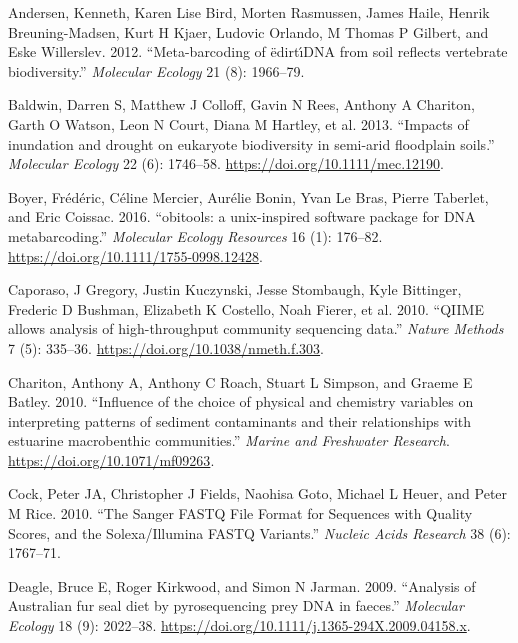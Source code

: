 \documentclass[
  letterpaper,
  DIV=11,
  numbers=noendperiod]{scrreprt}
\newlength{\cslhangindent}
\newlength{\cslentryspacingunit} %
\newenvironment{CSLReferences}[2] %
 {%
  \setlength{\parindent}{0pt}
  \ifodd #1
  \let\oldpar\par
  \def\par{\hangindent=\cslhangindent\oldpar}
  \fi
  \setlength{\parskip}{#2\cslentryspacingunit}
 }%
 {}
\begin{document}
\hypertarget{refs}{}
\begin{CSLReferences}{1}{0}
\leavevmode{}%
Andersen, Kenneth, Karen Lise Bird, Morten Rasmussen, James Haile,
Henrik Breuning-Madsen, Kurt H Kjaer, Ludovic Orlando, M Thomas P
Gilbert, and Eske Willerslev. 2012. {``{Meta-barcoding of {ë}dirt{ı́}DNA
from soil reflects vertebrate biodiversity}.''} \emph{Molecular Ecology}
21 (8): 1966--79.

\leavevmode{}%
Baldwin, Darren S, Matthew J Colloff, Gavin N Rees, Anthony A Chariton,
Garth O Watson, Leon N Court, Diana M Hartley, et al. 2013. {``{Impacts
of inundation and drought on eukaryote biodiversity in semi-arid
floodplain soils}.''} \emph{Molecular Ecology} 22 (6): 1746--58.
\url{https://doi.org/10.1111/mec.12190}.

\leavevmode{}%
Boyer, Frédéric, Céline Mercier, Aurélie Bonin, Yvan Le Bras, Pierre
Taberlet, and Eric Coissac. 2016. {``{obitools: a unix-inspired software
package for DNA metabarcoding}.''} \emph{Molecular Ecology Resources} 16
(1): 176--82. \url{https://doi.org/10.1111/1755-0998.12428}.

\leavevmode{}%
Caporaso, J Gregory, Justin Kuczynski, Jesse Stombaugh, Kyle Bittinger,
Frederic D Bushman, Elizabeth K Costello, Noah Fierer, et al. 2010.
{``{QIIME allows analysis of high-throughput community sequencing
data}.''} \emph{Nature Methods} 7 (5): 335--36.
\url{https://doi.org/10.1038/nmeth.f.303}.

\leavevmode{}%
Chariton, Anthony A, Anthony C Roach, Stuart L Simpson, and Graeme E
Batley. 2010. {``{Influence of the choice of physical and chemistry
variables on interpreting patterns of sediment contaminants and their
relationships with estuarine macrobenthic communities}.''} \emph{Marine
and Freshwater Research}. \url{https://doi.org/10.1071/mf09263}.

\leavevmode{}%
Cock, Peter JA, Christopher J Fields, Naohisa Goto, Michael L Heuer, and
Peter M Rice. 2010. {``The Sanger FASTQ File Format for Sequences with
Quality Scores, and the Solexa/Illumina FASTQ Variants.''} \emph{Nucleic
Acids Research} 38 (6): 1767--71.

\leavevmode{}%
Deagle, Bruce E, Roger Kirkwood, and Simon N Jarman. 2009. {``{Analysis
of Australian fur seal diet by pyrosequencing prey DNA in faeces}.''}
\emph{Molecular Ecology} 18 (9): 2022--38.
\url{https://doi.org/10.1111/j.1365-294X.2009.04158.x}.


\end{CSLReferences}
\end{document}
